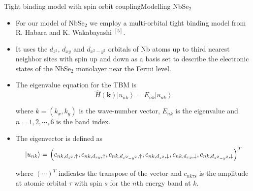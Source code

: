 \documentclass[9pt]{beamer}
\begin{document}
\begin{frame}{Tight binding model with spin orbit coupling}{Modelling NbSe$_2$}
  \begin{itemize}
    \item For our model of NbSe$_2$ we employ a multi-orbital tight binding model from R. Habara and K. Wakabayashi $^{[5]}$.

    \item It uses the $d_{z^2}$, $d_{xy}$ and $d_{x^2-y^2}$ orbitals of Nb atoms up to third nearest neighbor sites with spin up and down as a basis set to describe the electronic states of the NbSe$_2$ monolayer near the Fermi level.

    \item{The eigenvalue equation for the TBM is
      \begin{equation}
        \label{TBM_evalue_eqn}
        \hat{H}(\boldsymbol{k})\left|u_{n k}\right\rangle=E_{n k}\left|u_{n k}\right\rangle
      \end{equation}

      where $k=\left(k_{x}, k_{y}\right)$ is the wave-number vector, $E_{nk}$ is the eigenvalue and $n = 1,2,\cdots,6$ is the band index.
      }

    \item{The eigenvector is defined as
      \begin{equation}
        \left|u_{n k}\right\rangle=$ $\left(c_{n k, d_{z^{2}}, \uparrow}, c_{n k, d_{x y}, \uparrow}, c_{n k, d_{x^{2}-y^{2}}, \uparrow}, c_{n k, d_{z^{2}}, \downarrow}, c_{n k, d_{x y}, \downarrow}, c_{n k, d_{x^{2}-y^{2}}, \downarrow}\right)^{T}
      \end{equation}

      where $(\cdots)^T$ indicates the transpose of the vector and $c_{nk\tau s}$ is the amplitude at atomic orbital $\tau$ with spin $s$ for the $n$th energy band at $k$.
      }
  \end{itemize}
\end{frame}
\end{document}
